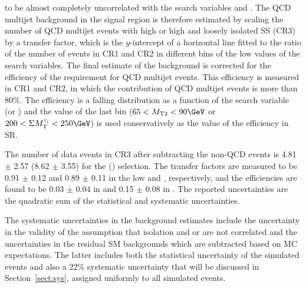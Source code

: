 to be almost completely uncorrelated with the search variables \mttwo and \SumMT.
The QCD multijet background in the signal region is therefore estimated by scaling the number of QCD multijet events with high \mttwo or high \SumMT and loosely isolated SS \tauTau (CR3) by a transfer factor, %
which is the $y$-intercept of a horizontal line fitted to the ratio of the number of events in CR1 and CR2 in different bins of the low values of the search variables.
The final estimate of the background 
is corrected for the efficiency of 
the \deltaphi requirement for QCD multijet events. This efficiency is measured in CR1 and CR2, 
in which the contribution of QCD multijet events is more than $80\%$. The efficiency is a falling distribution as a function of 
the search variable (\mttwo or \SumMT)
and the value of the last bin ($65<\mttwo<90\GeV$ or $200<\SumMT<250\GeV$) is used conservatively as the 
value of the efficiency in SR.

The number of data events in CR3 after subtracting the non-QCD events is 4.81 $\pm$ 2.57 (8.62 $\pm$ 3.55) for the \binone (\bintwo) selection.
The transfer factors are measured to be 0.91 $\pm$ 0.12 and 0.89 $\pm$ 0.11 in the low \mttwo and \SumMT, respectively, and 
the \deltaphi efficiencies are found to be 0.03 $\pm$ 0.04 in \binone and 0.15 $\pm$ 0.08 in \bintwo. 
The reported uncertainties are the quadratic sum of the statistical and systematic uncertainties.


The systematic uncertainties in the background estimates include the uncertainty in the validity of the assumption that isolation and \mttwo or \SumMT are not correlated and the uncertainties in the residual 
SM backgrounds which  are subtracted based on MC expectations. 
The latter includes both the statistical uncertainty of the simulated 
events and also a 22\% systematic uncertainty that will be discussed in Section~\ref{sect:sys}, 
assigned uniformly to all simulated events.

